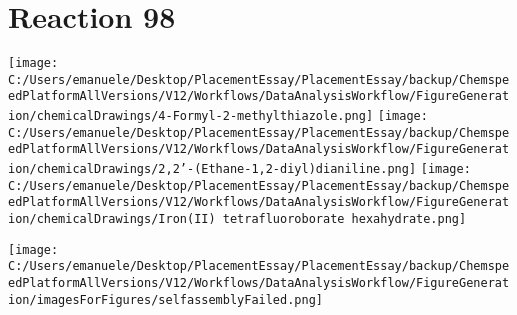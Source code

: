 \documentclass{article}%
\begin{document}
\section*{Reaction 98}%
%
\begin{scheme}[H]%
\begin{minipage}{0.5\textwidth}%
\texttt{[image: C:/Users/emanuele/Desktop/PlacementEssay/PlacementEssay/backup/ChemspeedPlatformAllVersions/V12/Workflows/DataAnalysisWorkflow/FigureGeneration/chemicalDrawings/4-Formyl-2-methylthiazole.png]}%
\texttt{[image: C:/Users/emanuele/Desktop/PlacementEssay/PlacementEssay/backup/ChemspeedPlatformAllVersions/V12/Workflows/DataAnalysisWorkflow/FigureGeneration/chemicalDrawings/2,2'-(Ethane-1,2-diyl)dianiline.png]}%
\texttt{[image: C:/Users/emanuele/Desktop/PlacementEssay/PlacementEssay/backup/ChemspeedPlatformAllVersions/V12/Workflows/DataAnalysisWorkflow/FigureGeneration/chemicalDrawings/Iron(II) tetrafluoroborate hexahydrate.png]}%
\end{minipage}%
\begin{minipage}{0.5\textwidth}%
\begin{center}%
\texttt{[image: C:/Users/emanuele/Desktop/PlacementEssay/PlacementEssay/backup/ChemspeedPlatformAllVersions/V12/Workflows/DataAnalysisWorkflow/FigureGeneration/imagesForFigures/selfassemblyFailed.png]}%
\end{center}%
\end{minipage}%
\caption{Self-assembly of components 1, 20, with Iron(II) in a 3.0:1.5:1.0 molar ratio in CH$_3$CN at 60\textdegree C for 40h. These are the reagents (starting materials) for reaction 98.}%
\end{scheme}%
\end{document}
